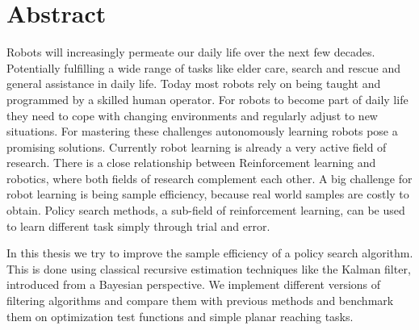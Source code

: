 
\chapter*{Abstract}

Robots will increasingly permeate our daily life over the next few decades.
Potentially fulfilling a wide range of tasks like elder care, search
and rescue and general assistance in daily life.
Today most robots rely on being
taught and programmed by a skilled human operator.
For robots to become part of daily life they need to cope
with changing environments and regularly adjust to new situations.
For mastering these challenges autonomously learning robots pose a
promising solutions.
Currently robot learning is already
a very active field of research. There is a close
relationship between Reinforcement learning and
robotics, where both fields of research complement each other.
A big challenge for robot learning is being sample efficiency,
because real world samples are costly to obtain.
Policy search methods, a sub-field of reinforcement learning,
can be used to learn different task simply through trial and error.


In this thesis we try to improve the sample efficiency
of a policy search algorithm.
This is done using classical recursive estimation
techniques like the Kalman filter, introduced from a Bayesian perspective.
We implement different versions of filtering algorithms and compare them with
previous methods and benchmark them on optimization test functions and simple
planar reaching tasks.